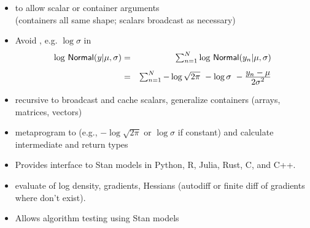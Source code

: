 \documentclass[10pt]{report}
\begin{document}
%
\begin{itemize}
\item {} to allow scalar or container arguments
  \\ {\footnotesize (containers all same shape; scalars broadcast as necessary)}
\item Avoid , e.g. $\log \sigma$ in
  \hspace*{-18pt}
  {\small
    \begin{eqnarray*}
      \textstyle \log \, \mbox{\sf Normal}(y | \mu, \sigma)
      & = & \textstyle \sum_{n=1}^N \log \, \mbox{\sf Normal}(y_n | \mu,\sigma)
      \\[4pt]
      & = & \textstyle \sum_{n=1}^N  - \log \sqrt{2\pi} \ - \log \sigma \ -
      \frac{\textstyle y_n - \mu}{\textstyle 2\sigma^2}
    \end{eqnarray*}
  }
\item recursive  to broadcast and cache scalars,
  generalize containers (arrays, matrices, vectors)
\item {} metaprogram to  (e.g., $-\log
  \sqrt{2 \pi}$ or $\log \sigma$ if constant)
  and calculate intermediate and return types
\end{itemize}

\begin{itemize}
\item Provides interface to Stan models in Python, R, Julia, Rust, C, and C++.
  \item evaluate of log density, gradients, Hessians (autodiff or finite diff of gradients where don't exist).
\item Allows algorithm testing using Stan models
\end{itemize}
\end{document}
